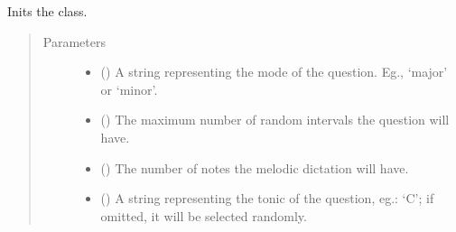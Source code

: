 \documentclass[letterpaper,10pt,english]{sphinxmanual}
\begin{document}
\begin{fulllineitems}
\begin{fulllineitems}
\label{\detokenize{birdears.questions:birdears.questions.melodicdictation.MelodicDictationQuestion.__init__}}
\sphinxAtStartPar
Inits the class.
\begin{quote}\begin{description}
\item[{Parameters}] \leavevmode\begin{itemize}
\item {} 
\sphinxAtStartPar
{} () \textendash{} A string representing the mode of the question.
Eg., ‘major’ or ‘minor’.

\item {} 
\sphinxAtStartPar
{} () \textendash{} The maximum number of random intervals
the question will have.

\item {} 
\sphinxAtStartPar
{} () \textendash{} The number of notes the melodic dictation will have.

\item {} 
\sphinxAtStartPar
{} () \textendash{} A string representing the tonic of the question,
eg.: ‘C’; if omitted, it will be selected randomly.


\end{itemize}
\end{description}
\end{quote}
\end{fulllineitems}
\end{fulllineitems}
\end{document}
